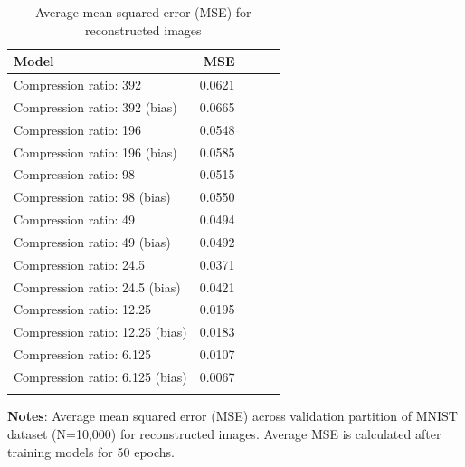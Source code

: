 \begin{table}[h]
	\caption{Average mean-squared error (MSE) for reconstructed images \label{table:mse-final}}
	\centering
	\begin{tabular}{lrrrr}
		\toprule
			Model &  MSE  \\
		\midrule
			\addlinespace{}
			\parbox{12.5cm}{Compression ratio: 392} & 0.0621 \\
			\addlinespace{}
			Compression ratio: 392 (bias) & 0.0665 \\
			\addlinespace{}
			Compression ratio: 196 & 0.0548 \\
			\addlinespace{}
			Compression ratio: 196 (bias) & 0.0585 \\
			\addlinespace{}
			Compression ratio: 98 & 0.0515 \\
			\addlinespace{}
			Compression ratio: 98 (bias) & 0.0550 \\
			\addlinespace{}
			Compression ratio: 49 & 0.0494 \\
			\addlinespace{}
			Compression ratio: 49 (bias) & 0.0492 \\
			\addlinespace{}
			Compression ratio: 24.5 & 0.0371 \\
			\addlinespace{}
			Compression ratio: 24.5 (bias) & 0.0421 \\
			\addlinespace{}
			Compression ratio: 12.25 & 0.0195 \\
			\addlinespace{}
			Compression ratio: 12.25 (bias) & 0.0183 \\
			\addlinespace{}
			Compression ratio: 6.125 & 0.0107 \\
			\addlinespace{}
			Compression ratio: 6.125 (bias) & 0.0067 \\
	\bottomrule
	\addlinespace[1em]
	\end{tabular}
	\parbox{14.5cm}{\textbf{Notes}: Average mean squared error (MSE) across validation partition of MNIST dataset (N=10,000) for reconstructed images. Average MSE is calculated after training models for 50 epochs.}
\end{table}